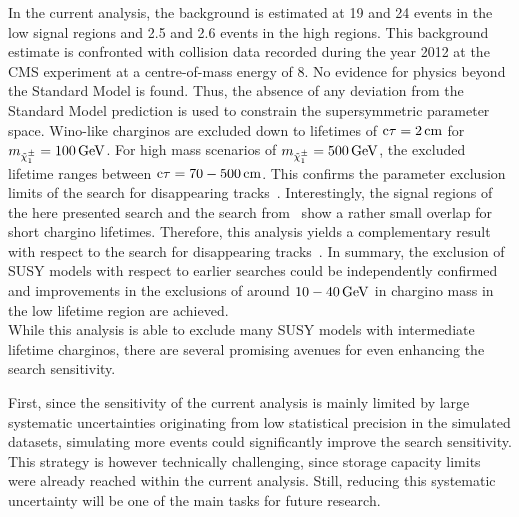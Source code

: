 In the current analysis, the background is estimated at 19 and 24 events in the low \ias signal regions and 2.5 and 2.6 events in the high \ias regions.
This background estimate is confronted with collision data recorded during the year 2012 at the CMS experiment at a centre-of-mass energy of 8\tev.
No evidence for physics beyond the Standard Model is found. %
Thus, the absence of any deviation from the Standard Model prediction is used to constrain the supersymmetric parameter space.
Wino-like charginos are excluded down to lifetimes of $\text{c}\tau=2\,\text{cm}$ for $m_{\tilde{\chi}^{\pm}_{1}}=100\,\text{Ge}\kern-0.06667em\text{V}$.
For high mass scenarios of $m_{\tilde{\chi}^{\pm}_{1}}=500\,\text{Ge}\kern-0.06667em\text{V}$, the excluded lifetime ranges between $\text{c}\tau=70-500\,\text{cm}$.
This confirms the parameter exclusion limits of the search for disappearing tracks~\cite{bib:CMS:DT_8TeV}.
Interestingly, the signal regions of the here presented search and the search from~\cite{bib:CMS:DT_8TeV} show a rather small overlap for short chargino lifetimes.
Therefore, this analysis yields a complementary result with respect to the search for disappearing tracks~\cite{bib:CMS:DT_8TeV}.
In summary, the exclusion of SUSY models with respect to earlier searches could be independently confirmed and improvements in the exclusions of around $10-40\,\text{Ge}\kern-0.06667em\text{V}$ in chargino mass in the low lifetime region are achieved.\\


While this analysis is able to exclude many SUSY models with intermediate lifetime charginos, there are several promising avenues for even enhancing the search sensitivity.

First, since the sensitivity of the current analysis is mainly limited by large systematic uncertainties originating from low statistical precision in the simulated datasets, simulating more events could significantly improve the search sensitivity.
This strategy is however technically challenging, since storage capacity limits were already reached within the current analysis.
Still, reducing this systematic uncertainty will be one of the main tasks for future research.

